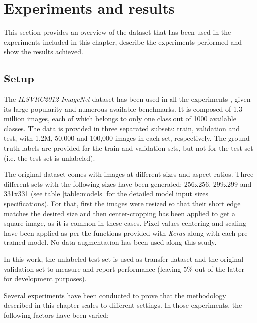  \section{Experiments and results} \label{sec:distillation_experiments}
This section provides an overview of the dataset that has been used in the experiments included in this chapter, describe the experiments performed and show the results achieved.

 \subsection{Setup}
 The \textit{ILSVRC2012 ImageNet} dataset has been used in all the experiments \autocite{ILSVRC15}, given its large popularity and numerous available benchmarks. It is composed of 1.3 million images,  each of which belongs to only one class out of 1000 available classes. The data is provided in three separated subsets: train, validation and test, with 1.2M, 50,000 and 100,000 images in each set, respectively. The ground truth labels are provided for the train and validation sets, but not for the test set (i.e. the test set is unlabeled).

 The original dataset comes with images at different sizes and aspect ratios. Three different sets with the following sizes have been generated: 256x256, 299x299 and 331x331 (see table \ref{table:models} for the detailed model input sizes specifications). For that, first the images were resized so that their short edge matches the desired size and then center-cropping has been applied to get a square image, as it is common in these cases. Pixel values centering and scaling have been applied as per the functions provided with \textit{Keras} along with each pre-trained model. No data augmentation has been used along this study.

 In this work, the unlabeled test set is used as transfer dataset and the original validation set to measure and report performance (leaving $5\%$ out of the latter for development purposes).

Several experiments have been conducted to prove that the methodology described in this chapter scales to different settings. In those experiments, the following factors have been varied:

